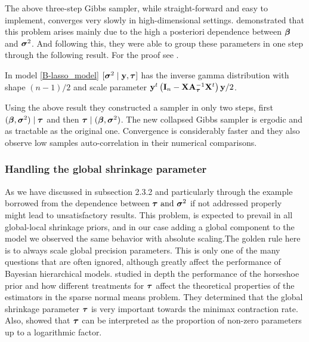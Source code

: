 \documentclass[ba]{imsart}
\begin{document}
\begin{appendix}
The above three-step Gibbs sampler, while straight-forward and easy to implement, converges very slowly in high-dimensional settings. \cite{Rajaratnam2017Gibbs} demonstrated that this problem arises mainly due to the high a posteriori dependence between $\boldsymbol{\beta}$ and $\boldsymbol{\sigma}^2$. And following this, they were able to group these parameters in one step through the following result. For the proof see \cite{Rajaratnam2017Gibbs}.

\begin{lemma}\label{sigma_collapsed}
In model \eqref{B-lasso_model} $[ \boldsymbol{\sigma}^2 \mid {\bf y} ,\boldsymbol{\tau} ]$ has the inverse gamma distribution with shape $(n-1)/2$ and scale parameter ${\bf y}^{t}\left( {\bf I}_n - {\bf X}{\bf A}_{\boldsymbol{\tau}}^{-1}{\bf X}^{t} \right){\bf y} /2 $.
\end{lemma}
Using the above result they constructed a sampler in only two steps, first $(\boldsymbol{\beta} , \boldsymbol{\sigma}^2) \mid  \boldsymbol{\tau}$ and then $\boldsymbol{\tau} \mid (\boldsymbol{\beta} , \boldsymbol{\sigma}^2)$. The new collapsed Gibbs sampler is ergodic and as tractable as the original one. Convergence is considerably faster and they also observe low samples auto-correlation in their numerical comparisons.


\subsubsection{Handling the global shrinkage parameter}

As we have discussed in subsection 2.3.2 and particularly through the example borrowed from \cite{polson2010shrink} the dependence between $\boldsymbol{\tau} \text{ and } \boldsymbol{\sigma}^{2}$ if not addressed properly might lead to unsatisfactory results. This problem, is expected to prevail in all global-local shrinkage priors, and in our case adding a global component to the model we observed the same behavior with absolute scaling.The golden rule here is to always scale global precision parameters. This is only one of the many questions that are often ignored, although greatly affect the performance of Bayesian hierarchical models. \cite{van2017adaptive} studied in depth the performance of the horseshoe prior and how different treatments for $\boldsymbol{\tau}$ affect the theoretical properties of the estimators in the sparse normal means problem. They determined that the global shrinkage parameter $\boldsymbol{\tau}$ is very important towards the minimax contraction rate. Also, \cite{van2014horseshoe} showed that $\boldsymbol{\tau}$ can be interpreted as the proportion of non-zero parameters up to a logarithmic factor.


\end{appendix}
\end{document}
